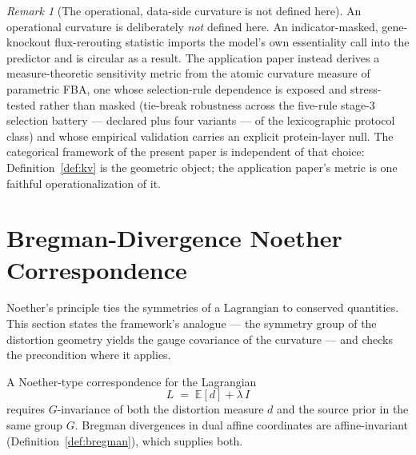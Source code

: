 \documentclass[11pt,a4paper]{article}
\theoremstyle{plain}
\theoremstyle{definition}
\theoremstyle{remark}
\newtheorem{remark}[theorem]{Remark}
\begin{document}
\begin{remark}[The operational, data-side curvature is not defined here]
\label{rem:operational-curvature}
An operational curvature is deliberately \emph{not} defined here. An
indicator-masked, gene-knockout flux-rerouting statistic imports
the model's own essentiality call into the predictor and is
circular as a result. The application paper \citep{zai2026measure}
instead derives a measure-theoretic sensitivity metric from the
atomic curvature measure of parametric FBA, one whose
selection-rule dependence is exposed and stress-tested rather than
masked (tie-break robustness across the five-rule stage-3 selection
battery --- declared plus four variants --- of the lexicographic
protocol class) and whose empirical validation carries an explicit
protein-layer null. The categorical framework of
the present paper is independent of that choice:
Definition~\ref{def:kv}
is the geometric object; the application paper's metric is one
faithful operationalization of it.
\end{remark}


\section{Bregman-Divergence Noether Correspondence}\label{sec:noether}

Noether's principle ties the symmetries of a Lagrangian to conserved
quantities. This section states the framework's analogue --- the
symmetry group of the distortion geometry yields the gauge covariance
of the curvature --- and checks the precondition where it applies.

A Noether-type correspondence for the Lagrangian
\begin{equation}\label{eq:lagrangian}
  L \;=\; \mathbb{E}[d] + \lambda\, I
\end{equation}
requires $G$-invariance of both the distortion measure $d$ and the
source prior in the same group $G$. Bregman divergences in dual affine
coordinates are affine-invariant (Definition~\ref{def:bregman}), which
supplies both.
\end{document}
